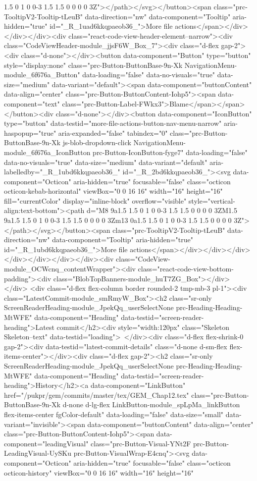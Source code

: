 1.5 0 1 0 0-3 1.5 1.5 0 0 0 0 3Z"></path></svg></button><span class="prc-TooltipV2-Tooltip-tLeuB" data-direction="nw" data-component="Tooltip" aria-hidden="true" id="_R_1uad6kkqpaeob36_">More file actions</span></div></div></div><div class="react-code-view-header-element--narrow"><div class="CodeViewHeader-module_jjsF6W_Box_7"><div class="d-flex gap-2"><div class="d-none"></div><button data-component="Button" type="button" style="display:none" class="prc-Button-ButtonBase-9n-Xk NavigationMenu-module_6f676a_Button" data-loading="false" data-no-visuals="true" data-size="medium" data-variant="default"><span data-component="buttonContent" data-align="center" class="prc-Button-ButtonContent-Iohp5"><span data-component="text" class="prc-Button-Label-FWkx3">Blame</span></span></button><div class="d-none"></div><button data-component="IconButton" type="button" data-testid="more-file-actions-button-nav-menu-narrow" aria-haspopup="true" aria-expanded="false" tabindex="0" class="prc-Button-ButtonBase-9n-Xk js-blob-dropdown-click NavigationMenu-module_6f676a_IconButton prc-Button-IconButton-fyge7" data-loading="false" data-no-visuals="true" data-size="medium" data-variant="default" aria-labelledby="_R_1ubd6kkqpaeob36_" id="_R_2bd6kkqpaeob36_"><svg data-component="Octicon" aria-hidden="true" focusable="false" class="octicon octicon-kebab-horizontal" viewBox="0 0 16 16" width="16" height="16" fill="currentColor" display="inline-block" overflow="visible" style="vertical-align:text-bottom"><path d="M8 9a1.5 1.5 0 1 0 0-3 1.5 1.5 0 0 0 0 3ZM1.5 9a1.5 1.5 0 1 0 0-3 1.5 1.5 0 0 0 0 3Zm13 0a1.5 1.5 0 1 0 0-3 1.5 1.5 0 0 0 0 3Z"></path></svg></button><span class="prc-TooltipV2-Tooltip-tLeuB" data-direction="nw" data-component="Tooltip" aria-hidden="true" id="_R_1ubd6kkqpaeob36_">More file actions</span></div></div></div></div></div></div></div><div class="CodeView-module_OCWcnq_contentWrapper"><div class="react-code-view-bottom-padding"><div class="BlobTopBanners-module_huT7ZG_Box"></div></div> <div class="d-flex flex-column border rounded-2 tmp-mb-3 pl-1"><div class="LatestCommit-module_smRmyW_Box"><h2 class="sr-only ScreenReaderHeading-module_JpekQq_userSelectNone prc-Heading-Heading-MtWFE" data-component="Heading" data-testid="screen-reader-heading">Latest commit</h2><div style="width:120px" class="Skeleton Skeleton--text" data-testid="loading"> </div><div class="d-flex flex-shrink-0 gap-2"><div data-testid="latest-commit-details" class="d-none d-sm-flex flex-items-center"></div><div class="d-flex gap-2"><h2 class="sr-only ScreenReaderHeading-module_JpekQq_userSelectNone prc-Heading-Heading-MtWFE" data-component="Heading" data-testid="screen-reader-heading">History</h2><a data-component="LinkButton" href="/pukpr/gem/commits/master/tex/GEM_Chap12.tex" class="prc-Button-ButtonBase-9n-Xk d-none d-lg-flex LinkButton-module_spLpMa_linkButton flex-items-center fgColor-default" data-loading="false" data-size="small" data-variant="invisible"><span data-component="buttonContent" data-align="center" class="prc-Button-ButtonContent-Iohp5"><span data-component="leadingVisual" class="prc-Button-Visual-YNt2F prc-Button-LeadingVisual-UySKu prc-Button-VisualWrap-E4cnq"><svg data-component="Octicon" aria-hidden="true" focusable="false" class="octicon octicon-history" viewBox="0 0 16 16" width="16" height="16" 